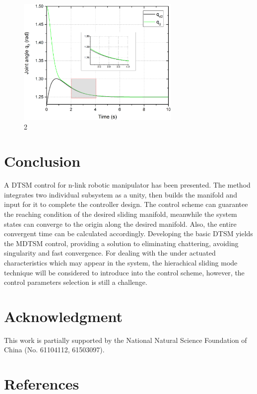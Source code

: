 \documentclass[3p]{elsarticle}
\theoremstyle{plain}
\theoremstyle{remark}
\begin{document}
\begin{figure}
\centering
\includegraphics[width=0.7\textwidth]{paper3_fig7.eps}
\caption{2}
\label{Figure:7}
\end{figure}
\section{Conclusion}\label{sec:5}
A DTSM control for n-link robotic manipulator has been presented. The method integrates two individual subsystem as a unity, then builds the manifold and input for it to complete the controller design. The control scheme can guarantee the reaching condition of the desired sliding manifold, meanwhile the system states can converge to the origin along the desired manifold. Also, the entire convergent time can be calculated accordingly. Developing the basic DTSM yields the MDTSM control, providing a solution to eliminating chattering, avoiding singularity and fast convergence. For dealing with the under actuated characteristics which may appear in the system, the hierachical sliding mode technique will be considered to introduce into the control scheme, however, the control parameters selection is still a challenge.
\section{Acknowledgment}
This work is partially supported by the National Natural Science Foundation of China (No. 61104112, 61503097).
\section{References}


\end{document}
